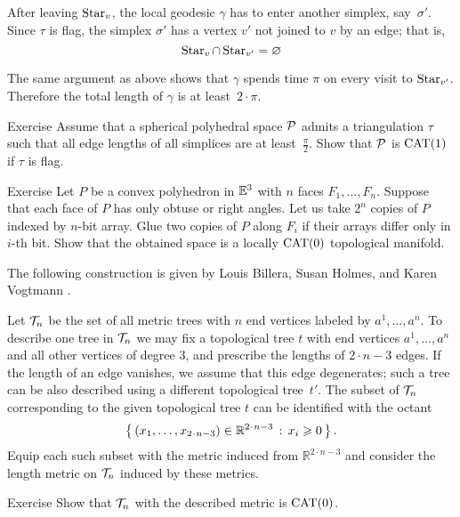After leaving $\mathop{\rm Star}\nolimits_v$,
the local geodesic $\gamma$ has to enter another simplex, 
say~$\sigma'$.
Since $\tau$ is flag, the simplex $\sigma'$
has a vertex $v'$ not joined to $v$ by an edge;
that is, 
\[\mathop{\rm Star}\nolimits_v\cap\mathop{\rm Star}\nolimits_{v'}=\varnothing\]

The same argument as above shows that $\gamma$ spends time $\pi$ on every visit to $\mathop{\rm Star}\nolimits_{v'}$.
Therefore the total length of $\gamma$ is at least~$2\cdot\pi$.
\qeds

\begin{thm}{Exercise}\label{ex:flag>=pi/2}
Assume that a spherical polyhedral space $\mathcal{P}$
admits a triangulation $\tau$ such that all edge lengths of all simplices are at least~$\tfrac\pi2$.
Show that $\mathcal{P}$ is $\mathrm{CAT}(1)$
if $\tau$ is flag.
\end{thm}

\begin{thm}{Exercise}\label{ex:polyhedron-glue}
Let $P$ be a convex polyhedron in $\mathbb{E}^3$ with $n$ faces $F_1,\dots, F_n$.
Suppose that each face of $P$ has only obtuse or right angles.
Let us take $2^n$ copies of $P$ indexed by $n$-bit array.
Glue two copies of $P$ along $F_i$ if their arrays differ only in $i$-th bit.
Show that the obtained space is a locally $\mathrm{CAT}(0)$ topological manifold.
\end{thm}

The following construction is given by
Louis Billera,
Susan Holmes,
and  Karen Vogtmann \cite{billera-holmes-vogtmann}.

Let $\mathcal{T}_n$ be the set of all metric trees with 
$n$ end vertices
labeled by $a^1,\dots,a^n$.
To describe one tree in $\mathcal{T}_n$ we may fix a topological tree $t$ with end vertices $a^1,\dots,a^n$ 
and all  other vertices of degree 3,  
and prescribe the lengths of $2\cdot n-3$ edges.
If the length of an edge vanishes, we assume that this edge degenerates;
such a tree can be also described using a different topological tree~$t'$.
The subset of $\mathcal{T}_n$ corresponding to the given topological tree $t$ can be identified with the octant
\[\set{(x_1,\dots,x_{2\cdot n-3})\in\mathbb{R}^{2\cdot n-3}}{x_i\ge 0}.\]
Equip each such subset with the metric induced from $\mathbb{R}^{2\cdot n-3}$ and consider the length metric on $\mathcal{T}_n$ induced by these metrics.

\begin{thm}{Exercise}\label{ex:tree}
Show that $\mathcal{T}_n$ with the described metric is $\mathrm{CAT}(0)$.
\end{thm}

